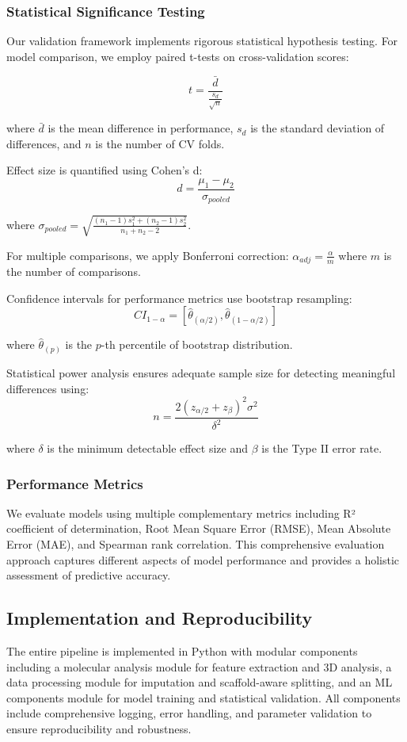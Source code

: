 \documentclass[preprint, 10pt]{elsarticle}
\begin{document}
\subsubsection{Statistical Significance Testing}
Our validation framework implements rigorous statistical hypothesis testing. For model comparison, we employ paired t-tests on cross-validation scores:

$$t = \frac{\bar{d}}{\frac{s_d}{\sqrt{n}}}$$

where $\bar{d}$ is the mean difference in performance, $s_d$ is the standard deviation of differences, and $n$ is the number of CV folds.

Effect size is quantified using Cohen's d:
$$d = \frac{\mu_1 - \mu_2}{\sigma_{pooled}}$$

where $\sigma_{pooled} = \sqrt{\frac{(n_1-1)s_1^2 + (n_2-1)s_2^2}{n_1+n_2-2}}$.

For multiple comparisons, we apply Bonferroni correction: $\alpha_{adj} = \frac{\alpha}{m}$ where $m$ is the number of comparisons.

Confidence intervals for performance metrics use bootstrap resampling:
$$CI_{1-\alpha} = [\hat{\theta}_{(\alpha/2)}, \hat{\theta}_{(1-\alpha/2)}]$$

where $\hat{\theta}_{(p)}$ is the $p$-th percentile of bootstrap distribution.

Statistical power analysis ensures adequate sample size for detecting meaningful differences using:
$$n = \frac{2(z_{\alpha/2} + z_\beta)^2 \sigma^2}{\delta^2}$$

where $\delta$ is the minimum detectable effect size and $\beta$ is the Type II error rate.

\subsubsection{Performance Metrics}
We evaluate models using multiple complementary metrics including R² coefficient of determination, Root Mean Square Error (RMSE), Mean Absolute Error (MAE), and Spearman rank correlation. This comprehensive evaluation approach captures different aspects of model performance and provides a holistic assessment of predictive accuracy.

\subsection{Implementation and Reproducibility}

The entire pipeline is implemented in Python with modular components including a molecular analysis module for feature extraction and 3D analysis, a data processing module for imputation and scaffold-aware splitting, and an ML components module for model training and statistical validation. All components include comprehensive logging, error handling, and parameter validation to ensure reproducibility and robustness.
\end{document}
